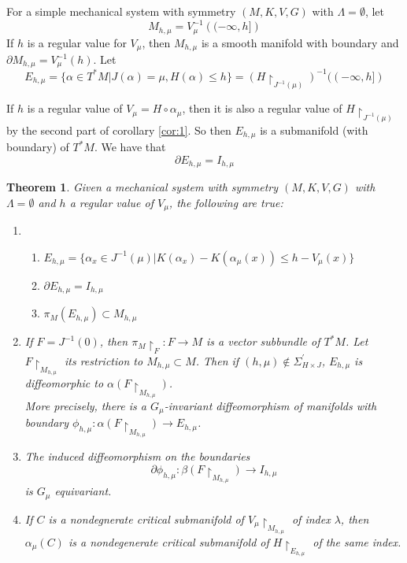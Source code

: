 \documentclass{article}
\newtheorem{thm}{Theorem}
\begin{document}
\indent For a simple mechanical system with symmetry $(M,K,V,G)$ with $\Lambda = \emptyset$, let
\begin{equation}
    M_{h,\mu} = V^{-1}_{\mu} \left( (-\infty, h] \right)
\end{equation}
\indent If $h$ is a regular value for $V_{\mu}$, then $M_{h,\mu}$ is a smooth manifold with boundary and $\partial M_{h,\mu} = V^{-1}_{\mu}(h)$. Let
\begin{equation}
    E_{h,\mu}= \{ \alpha \in T^*M \vert J(\alpha)=\mu, H(\alpha) \leq h \} = (H \restriction_{J^{-1}(\mu)})^{-1}((-\infty, h])
\end{equation}

If $h$ is a regular value of $V_{\mu}=H \circ \alpha_{\mu}$, then it is also a regular value of $H \restriction_{J^{-1}(\mu)}$ by the second part of corollary \ref{cor:1}. So then $E_{h,\mu}$ is a submanifold (with boundary) of $T^*M$. We have that
\begin{equation}
    \partial E_{h,\mu} = I_{h,\mu}
\end{equation}

\begin{thm}
Given a mechanical system with symmetry $(M,K,V,G)$ with $\Lambda = \emptyset$ and $h$ a regular value of $V_{\mu}$, the following are true:
\begin{enumerate}
    \item \begin{enumerate}
        \item $E_{h,\mu}= \{ \alpha_x \in J^{-1}(\mu) \vert K(\alpha_x)-K(\alpha_{\mu}(x)) \leq h - V_{\mu}(x) \}$
        \item $\partial E_{h,\mu} = I_{h,\mu}$
        \item $\pi_M(E_{h,\mu}) \subset M_{h,\mu}$
    \end{enumerate}
    \item If $F=J^{-1}(0)$, then $\pi_M \restriction_{F}: F \to M$ is a vector subbundle of $T^*M$. Let $F\restriction_{M_{h,\mu}}$ its restriction to $M_{h,\mu} \subset M$. Then if $(h,\mu) \notin \Sigma^{\prime}_{H \times J}$, $E_{h,\mu}$ is diffeomorphic to $\alpha(F \restriction_{M_{h,\mu}})$.\\
    \indent More precisely, there is a $G_{\mu}$-invariant diffeomorphism of manifolds with boundary $\phi_{h,\mu}:\alpha(F \restriction_{M_{h,\mu}}) \to E_{h,\mu}$.
    \item The induced diffeomorphism on the boundaries
    \begin{equation}
        \partial \phi_{h,\mu} : \beta(F \restriction_{M_{h,\mu}}) \to I_{h,\mu}
    \end{equation}
    is $G_{\mu}$ equivariant.
    \item If $C$ is a nondegnerate critical submanifold of $V_{\mu} \restriction_{M_{h,\mu}}$ of index $\lambda$, then $\alpha_{\mu}(C)$ is a nondegenerate critical submanifold of $H \restriction_{E_{h,\mu}}$ of the same index.
\end{enumerate}
\end{thm}
\end{document}
